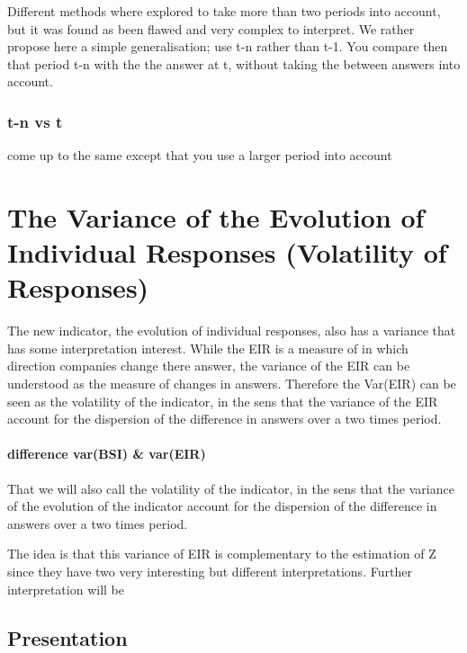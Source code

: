 \documentclass[12pt,a4paper,oneside]{book}
\begin{document}
Different methods where explored to take more than two periods into account, but it was found as been flawed and very complex to interpret.
We rather propose here a simple generalisation; use t-n rather than t-1. You compare then that period t-n with the the answer at t, without taking the between answers into account.

\subsection{t-n vs t}

come up to the same except that you use a larger period into account


\chapter{The Variance of the Evolution of Individual Responses (Volatility of Responses)} \label{Chapter:Z}

The new indicator, the evolution of individual responses, also has a variance that has some interpretation interest. 
While the EIR is a measure of in which direction companies change there answer, the variance of the EIR can be understood as the measure of changes in answers. Therefore the Var(EIR) can be seen as the volatility of the indicator, in the sens that the variance of the EIR account for the dispersion of the difference in answers over a two times period.

\subsubsection{difference var(BSI) \& var(EIR)}

That we will also call the volatility of the indicator, in the sens that the variance of the evolution of the indicator account for the dispersion of the difference in answers over a two times period.


The idea is that this variance of EIR is complementary to the estimation of Z since they have two very interesting but different interpretations.
Further interpretation will be 

\section{Presentation}
\end{document}
